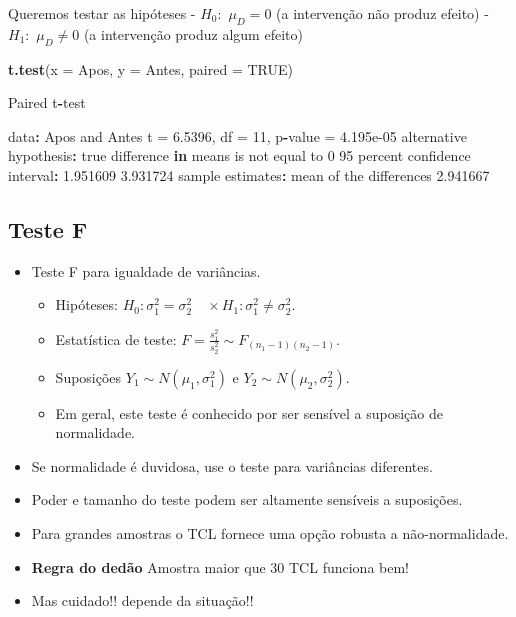 \documentclass[10pt,a4paper]{book}
\newenvironment{Shaded}{\begin{snugshade}}{\end{snugshade}}
\newcommand{\KeywordTok}[1]{\textcolor[rgb]{0.13,0.29,0.53}{\textbf{#1}}}
\newcommand{\DataTypeTok}[1]{\textcolor[rgb]{0.13,0.29,0.53}{#1}}
\newcommand{\DecValTok}[1]{\textcolor[rgb]{0.00,0.00,0.81}{#1}}
\newcommand{\FloatTok}[1]{\textcolor[rgb]{0.00,0.00,0.81}{#1}}
\newcommand{\StringTok}[1]{\textcolor[rgb]{0.31,0.60,0.02}{#1}}
\newcommand{\OtherTok}[1]{\textcolor[rgb]{0.56,0.35,0.01}{#1}}
\newcommand{\ControlFlowTok}[1]{\textcolor[rgb]{0.13,0.29,0.53}{\textbf{#1}}}
\newcommand{\OperatorTok}[1]{\textcolor[rgb]{0.81,0.36,0.00}{\textbf{#1}}}
\newcommand{\NormalTok}[1]{#1}
\providecommand{\tightlist}{%
  \setlength{\itemsep}{0pt}\setlength{\parskip}{0pt}}
\begin{document}
Queremos testar as hipóteses - \(H_0:\) \(\mu_D = 0\) (a intervenção não
produz efeito) - \(H_1:\) \(\mu_D \neq 0\) (a intervenção produz algum
efeito)

\begin{Shaded}
\begin{Highlighting}[]
\KeywordTok{t.test}\NormalTok{(}\DataTypeTok{x =}\NormalTok{ Apos, }\DataTypeTok{y =}\NormalTok{ Antes, }\DataTypeTok{paired =} \OtherTok{TRUE}\NormalTok{)}

\NormalTok{    Paired t}\OperatorTok{-}\NormalTok{test}

\NormalTok{data}\OperatorTok{:}\StringTok{  }\NormalTok{Apos and Antes}
\NormalTok{t =}\StringTok{ }\FloatTok{6.5396}\NormalTok{, df =}\StringTok{ }\DecValTok{11}\NormalTok{, p}\OperatorTok{-}\NormalTok{value =}\StringTok{ }\FloatTok{4.195e-05}
\NormalTok{alternative hypothesis}\OperatorTok{:}\StringTok{ }\NormalTok{true difference }\ControlFlowTok{in}\NormalTok{ means is not equal to }\DecValTok{0}
\DecValTok{95}\NormalTok{ percent confidence interval}\OperatorTok{:}
\StringTok{ }\FloatTok{1.951609} \FloatTok{3.931724}
\NormalTok{sample estimates}\OperatorTok{:}
\NormalTok{mean of the differences }
               \FloatTok{2.941667} 
\end{Highlighting}
\end{Shaded}

\subsection{Teste F}\label{teste-f}

\begin{itemize}
\tightlist
\item
  Teste F para igualdade de variâncias.

  \begin{itemize}
  \tightlist
  \item
    Hipóteses:
    \(H_0: \sigma^2_1 = \sigma^2_2 \quad \times H_1: \sigma^2_1 \neq \sigma^2_2\).
  \item
    Estatística de teste:
    \(F = \frac{s^2_1}{s^2_2} \sim F_{(n_1-1)(n_2-1)}\).
  \item
    Suposições \(Y_1 \sim N(\mu_1, \sigma^2_1)\) e
    \(Y_2 \sim N(\mu_2, \sigma^2_2)\).
  \item
    Em geral, este teste é conhecido por ser sensível a suposição de
    normalidade.
  \end{itemize}
\item
  Se normalidade é duvidosa, use o teste para variâncias diferentes.
\item
  Poder e tamanho do teste podem ser altamente sensíveis a suposições.
\item
  Para grandes amostras o TCL fornece uma opção robusta a
  não-normalidade.
\item
  \textbf{Regra do dedão} Amostra maior que \(30\) TCL funciona bem!
\item
  Mas cuidado!! depende da situação!!
\end{itemize}
\end{document}
